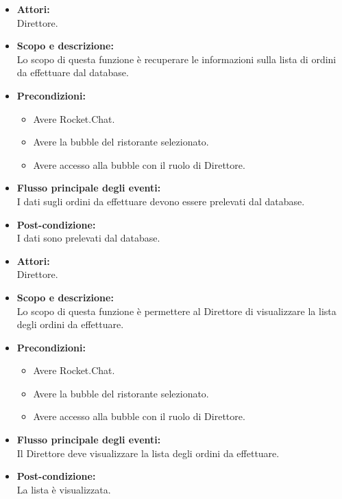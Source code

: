 \begin{itemize}
	\item \textbf{Attori:}
	\\Direttore.
	\item \textbf{Scopo e descrizione:} 
	\\Lo scopo di questa funzione è recuperare le informazioni sulla lista di ordini da effettuare dal database.
	\item \textbf{Precondizioni:}
	\begin{itemize}
		\item Avere Rocket.Chat.
		\item Avere la bubble del ristorante selezionato.
		\item Avere accesso alla bubble con il ruolo di Direttore.
	\end{itemize}
	\item \textbf{Flusso principale degli eventi:}
	\\I dati sugli ordini da effettuare devono essere prelevati dal database.
	\item \textbf{Post-condizione:}
	\\I dati sono prelevati dal database.
\end{itemize}


\begin{itemize}
	\item \textbf{Attori:}
	\\Direttore.
	\item \textbf{Scopo e descrizione:} 
	\\Lo scopo di questa funzione è permettere al Direttore di visualizzare la lista degli ordini da effettuare.
	\item \textbf{Precondizioni:}
	\begin{itemize}
		\item Avere Rocket.Chat.
		\item Avere la bubble del ristorante selezionato.
		\item Avere accesso alla bubble con il ruolo di Direttore.
	\end{itemize}
	\item \textbf{Flusso principale degli eventi:}
	\\Il Direttore deve visualizzare la lista degli ordini da effettuare.
	\item \textbf{Post-condizione:}
	\\La lista è visualizzata.
\end{itemize}

